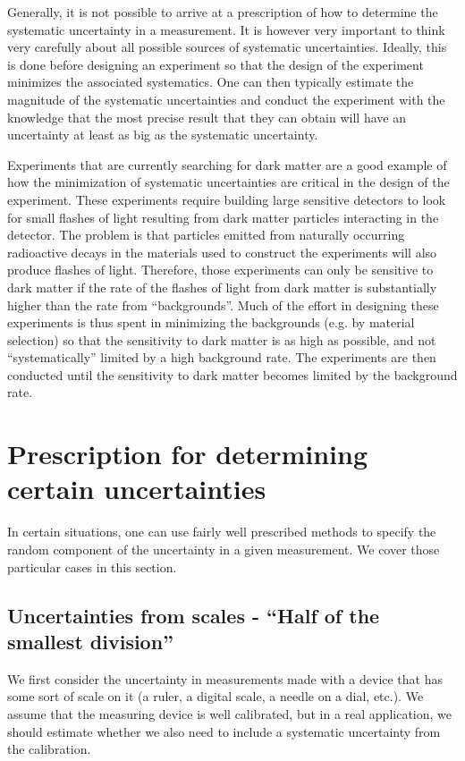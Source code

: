Generally, it is not possible to arrive at a prescription of how to determine the systematic uncertainty in a measurement. It is however very important to think very carefully about all possible sources of systematic uncertainties. Ideally, this is done before designing an experiment so that the design of the experiment minimizes the associated systematics. One can then typically estimate the magnitude of the systematic uncertainties and conduct the experiment with the knowledge that the most precise result that they can obtain will have an uncertainty at least as big as the systematic uncertainty.

Experiments that are currently searching for dark matter are a good example of how the minimization of systematic uncertainties are critical in the design of the experiment. These experiments require building large sensitive detectors to look for small flashes of light resulting from dark matter particles interacting in the detector. The problem is that particles emitted from naturally occurring radioactive decays in the materials used to construct the experiments will also produce flashes of light. Therefore, those experiments can only be sensitive to dark matter if the rate of the flashes of light from dark matter is substantially higher than the rate from ``backgrounds''. Much of the effort in designing these experiments is thus spent in minimizing the backgrounds (e.g. by material selection) so that the sensitivity to dark matter is as high as possible, and not ``systematically'' limited by a high background rate. The experiments are then conducted until the sensitivity to dark matter becomes limited by the background rate.

\section{Prescription for determining certain uncertainties}
In certain situations, one can use fairly well prescribed methods to specify the random component of the uncertainty in a given measurement. We cover those particular cases in this section.

\subsection{Uncertainties from scales - ``Half of the smallest division''}
We first consider the uncertainty in measurements made with a device that has some sort of scale on it (a ruler, a digital scale, a needle on a dial, etc.). We assume that the measuring device is well calibrated, but in a real application, we should estimate whether we also need to include a systematic uncertainty from the calibration. 

